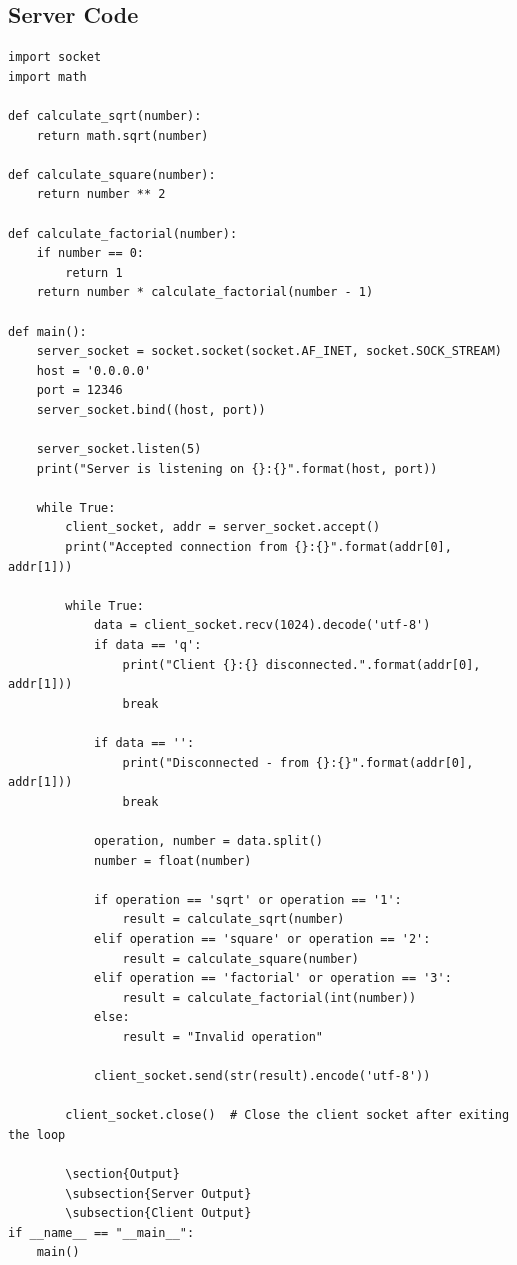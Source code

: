 \documentclass{article}
\begin{document}
\subsection{Server Code}
\begin{lstlisting}[style=python]
import socket
import math

def calculate_sqrt(number):
    return math.sqrt(number)

def calculate_square(number):
    return number ** 2

def calculate_factorial(number):
    if number == 0:
        return 1
    return number * calculate_factorial(number - 1)

def main():
    server_socket = socket.socket(socket.AF_INET, socket.SOCK_STREAM)
    host = '0.0.0.0'
    port = 12346
    server_socket.bind((host, port))

    server_socket.listen(5)
    print("Server is listening on {}:{}".format(host, port))

    while True:
        client_socket, addr = server_socket.accept()
        print("Accepted connection from {}:{}".format(addr[0], addr[1]))

        while True:
            data = client_socket.recv(1024).decode('utf-8')
            if data == 'q':  
                print("Client {}:{} disconnected.".format(addr[0], addr[1]))
                break  

            if data == '':
                print("Disconnected - from {}:{}".format(addr[0], addr[1]))
                break
            
            operation, number = data.split()
            number = float(number)

            if operation == 'sqrt' or operation == '1':
                result = calculate_sqrt(number)
            elif operation == 'square' or operation == '2':
                result = calculate_square(number)
            elif operation == 'factorial' or operation == '3':
                result = calculate_factorial(int(number))
            else:
                result = "Invalid operation"

            client_socket.send(str(result).encode('utf-8'))

        client_socket.close()  # Close the client socket after exiting the loop

        \section{Output}
        \subsection{Server Output}
        \subsection{Client Output}
if __name__ == "__main__":
    main()
\end{lstlisting}
\end{document}
